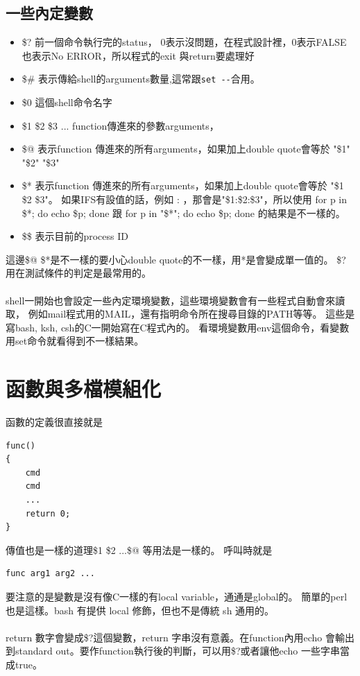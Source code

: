     \subsection{一些內定變數}
    \begin{itemize}
    \item \$? 前一個命令執行完的status，
      0表示沒問題，在程式設計裡，0表示FALSE也表示No ERROR，所以程式的exit
      與return要處理好
    \item \$\# 表示傳給shell的arguments數量,這常跟\verb=set --=合用。
    \item \$0 這個shell命令名字
    \item \$1 \$2 \$3 ... function傳進來的參數arguments，
    \item \$@ 表示function 傳進來的所有arguments，如果加上double quote會等於
      "\$1" "\$2" "\$3"
    \item \$* 表示function 傳進來的所有arguments，如果加上double quote會等於
      "\$1 \$2 \$3"。 如果IFS有設值的話，例如 : ，那會是"\$1:\$2:\$3"，所以使用
      for p in \$*; do echo \$p; done 跟 for p in "\$*"; do echo \$p; done
      的結果是不一樣的。
    \item \$\$ 表示目前的process ID
    \end{itemize}
    這邊\$@ \$*是不一樣的要小心double quote的不一樣，用*是會變成單一值的。
    \$?用在測試條件的判定是最常用的。
    \\\\
    shell一開始也會設定一些內定環境變數，這些環境變數會有一些程式自動會來讀取，
    例如mail程式用的MAIL，還有指明命令所在搜尋目錄的PATH等等。
    這些是寫bash, ksh, csh的C一開始寫在C程式內的。
    看環境變數用env這個命令，看變數用set命令就看得到不一樣結果。

    \section{函數與多檔模組化}
    函數的定義很直接就是
    \begin{verbatim}
func()
{
    cmd
    cmd
    ...
    return 0;
}
    \end{verbatim}
    傳值也是一樣的道理\$1 \$2 ...\$@ 等用法是一樣的。
    呼叫時就是
    \begin{verbatim}
func arg1 arg2 ...
    \end{verbatim}
    要注意的是變數是沒有像C一樣的有local variable，通通是global的。
    簡單的perl也是這樣。bash 有提供 local 修飾，但也不是傳統 sh 通用的。
    \\\\
    return 數字會變成\$?這個變數，return 字串沒有意義。在function內用echo
    會輸出到standard out。要作function執行後的判斷，可以用\$?或者讓他echo
    一些字串當成true。
